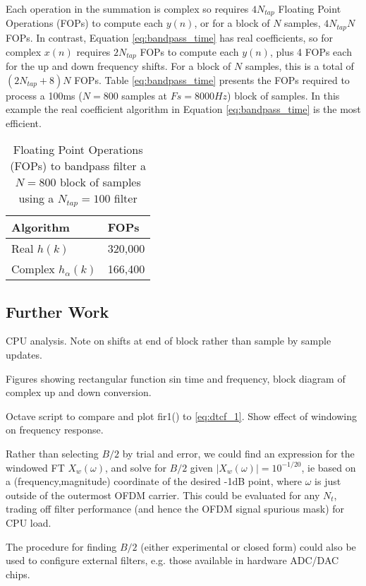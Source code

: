 \documentclass{article}
\begin{document}
Each operation in the summation is complex so requires $4N_{tap}$ Floating Point Operations (FOPs) to compute each $y(n)$, or for a block of $N$ samples, $4N_{tap}N$ FOPs.  In contrast, Equation \ref{eq:bandpass_time} has real coefficients, so for complex $x(n)$ requires $2N_{tap}$ FOPs to compute each $y(n)$, plus 4 FOPs each for the up and down frequency shifts. For a block of $N$ samples, this is a total of $(2N_{tap}+8)N$ FOPs. Table \ref{eq:bandpass_time} presents the FOPs required to process a 100ms ($N=800$ samples at $Fs=8000 Hz$) block of samples.  In this example the real coefficient algorithm in Equation \ref{eq:bandpass_time} is the most efficient.

\begin{table}[h]
\centering
\begin{tabular}{l l }
 \hline
 Algorithm & FOPs \\
 \hline
 Real $h(k)$ & 320,000 \\ 
 Complex $h_{\alpha}(k)$ & 166,400 \\
 \hline
\end{tabular}
\caption{Floating Point Operations (FOPs) to bandpass filter a $N=800$ block of samples using a $N_{tap}=100$ filter}
\label{table:ratek1_mean_E}
\end{table}

\subsection {Further Work}

CPU analysis.  Note on shifts at end of block rather than sample by sample updates.

Figures showing rectangular function sin time and frequency, block diagram of complex up and down conversion.

Octave script to compare and plot fir1() to \ref{eq:dtcf_1}. Show effect of windowing on frequency response.

Rather than selecting $B/2$ by trial and error, we could find an expression for the windowed FT $X_w(\omega)$, and solve for $B/2$ given $|X_w(\omega)|=10^{-1/20}$, ie based on a (frequency,magnitude) coordinate of the desired -1dB point, where $\omega$ is just outside of the outermost OFDM carrier.  This could be evaluated for any $N_t$, trading off filter performance (and hence the OFDM signal spurious mask) for CPU load.  

The procedure for finding $B/2$ (either experimental or closed form) could also be used to configure external filters, e.g. those available in hardware ADC/DAC chips.



\end{document}
